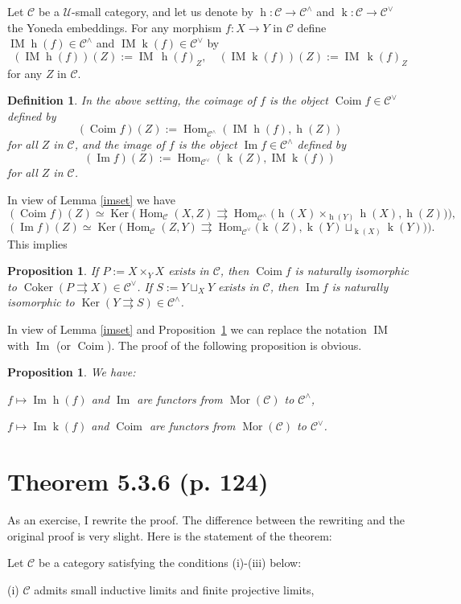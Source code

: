 \documentclass[12pt]{article}
\newtheorem{prop}[thm]{Proposition}
\newtheorem{defn}[thm]{Definition}
\theoremstyle{remark}
\newcommand{\n}{\noindent}
\newcommand{\C}{\mathcal C}
\newcommand{\U}{\mathcal U}
\newcommand{\pa}{\rightrightarrows}
\newcommand{\pr}{Proposition}
\DeclareMathOperator{\Coim}{Coim}
\DeclareMathOperator{\Coker}{Coker}
\DeclareMathOperator{\Ima}{Im}
\DeclareMathOperator{\IM}{IM}
\DeclareMathOperator{\hy}{h}
\DeclareMathOperator{\ky}{k}
\DeclareMathOperator{\h}{Hom}
\DeclareMathOperator{\Ker}{Ker}
\DeclareMathOperator{\Mor}{Mor}
\begin{document}
Let $\C$ be a $\U$-small category, and let us denote by $\hy:\C\to\C^\wedge$ and $\ky:\C\to\C^\vee$ the Yoneda embeddings. For any morphism $f:X\to Y$ in $\C$ define $\IM\hy(f)\in\C^\wedge$ and $\IM\ky(f)\in\C^\vee$ by 
$$ 
(\IM\hy(f))(Z):=\IM\,\hy(f)_Z,\quad(\IM\ky(f))(Z):=\IM\,\ky(f)_Z 
$$ 
for any $Z$ in $\C$. 
%
\begin{defn} 
In the above setting, the {\em coimage} of $f$ is the object $\Coim f\in\C^\vee$ defined by 
$$ 
(\Coim f)(Z):=\h_{\C^\wedge}(\IM\hy(f),\hy(Z))
$$ 
for all $Z$ in $\C$, and the {\em image} of $f$ is the object $\Ima f\in\C^\wedge$ defined by 
$$ 
(\Ima f)(Z):=\h_{\C^\vee}(\ky(Z),\IM\ky(f)) 
$$ 
for all $Z$ in $\C$. 
\end{defn} 
%

In view of Lemma \ref{imset} we have 
$$ 
(\Coim f)(Z)\simeq\Ker\Big(\h_\C(X,Z)\pa\h_{\C^\wedge}\big(\hy(X)\times_{\hy(Y)}\hy(X),\hy(Z)\big)\Big), 
$$ 
$$ 
(\Ima f)(Z)\simeq\Ker\Big(\h_\C(Z,Y)\pa\h_{\C^\vee}\big(\ky(Z),\ky(Y)\sqcup_{\ky(X)}\ky(Y)\big)\Big). 
$$ 
This implies 
% 
\begin{prop}\label{coimim}
If $P:=X\times_YX$ exists in $\C$, then $\Coim f$ is naturally isomorphic to $\Coker(P\pa X)\in\C^\vee$. If $S:=Y\sqcup_XY$ exists in $\C$, then $\Ima f$ is naturally isomorphic to $\Ker(Y\pa S)\in\C^\wedge$. 
\end{prop} 
%  

In view of Lemma \ref{imset} and \pr\ \ref{coimim} we can replace the notation $\IM$ with $\Ima$ (or $\Coim$). The proof of the following proposition is obvious. 
% 
\begin{prop}\label{fun}
We have: 

$f\mapsto\Ima\hy(f)$ and $\Ima$ are functors from $\Mor(\C)$ to $\C^\wedge$, 

$f\mapsto\Ima\ky(f)$ and $\Coim$ are functors from $\Mor(\C)$ to $\C^\vee$. 
% 
\end{prop} 
% 
\section{Theorem 5.3.6 (p. 124)}%
% 
As an exercise, I rewrite the proof. The difference between the rewriting and the original proof is very slight. Here is the statement of the theorem:\bigskip

\centerline *

\n Let $\C$ be a category satisfying the conditions (i)-(iii) below:

\n (i) $\C$ admits small inductive limits and finite projective limits, 
\end{document}
